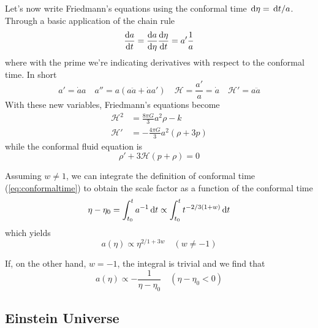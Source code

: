 \par Let's now write Friedmann's equations using the conformal time $\,\text{d}\eta = \,\text{d}t/a$. Through a basic application of the chain rule
\begin{equation}
    \frac{\text{d}a}{\text{d}t} = \frac{\text{d}a}{\text{d}\eta}\frac{\text{d}\eta}{\text{d}t} = a' \frac{1}{a}
\end{equation}
where with the prime we're indicating derivatives with respect to the conformal time. In short
\begin{equation}
    a' = \dot{a}a \quad a'' = a(a\ddot{a}+\dot{a}a') \quad \mathcal{H} = \frac{a'}{a} = \dot{a} \quad \mathcal{H}' = a\ddot{a}
\end{equation}
With these new variables, Friedmann's equations become
\begin{align}
    \label{eq:f2_conf}
    \mathcal{H}^{2} &= \frac{8\pi G}{3}a^{2}\rho - k\\
    \mathcal{H}' &= -\frac{4\pi G}{3}a^{2}(\rho + 3p)
    \label{eq:f1_conf}
\end{align}
while the conformal fluid equation is
\begin{equation}
    \rho' + 3\mathcal{H}(p+\rho) = 0
    \label{eq:fluideq_conf}
\end{equation}
\par Assuming $w \neq 1$, we can integrate the definition of conformal time (\ref{eq:conformaltime}) to obtain the scale factor as a function of the conformal time
\begin{equation}
    \eta - \eta_{0} = \int_{t_{0}}^{t} a^{-1}\,\text{d}t \propto \int_{t_{0}}^{t} t^{-2/3(1+w)}\,\text{d}t
\end{equation}
which yields
\begin{equation}
    a(\eta) \propto \eta^{2/1+3w} \quad (w \neq -1)
    \label{eq:scalefactor_ev_conf}
\end{equation}
\par If, on the other hand, $w = -1$, the integral is trivial and we find that
\begin{equation}
    a(\eta) \propto -\frac{1}{\eta - \eta_{0}} \quad (\eta - \eta_{0} < 0)
    \label{eq:scalefactor_ev_conf_cc}
\end{equation}

\subsection{Einstein Universe}

